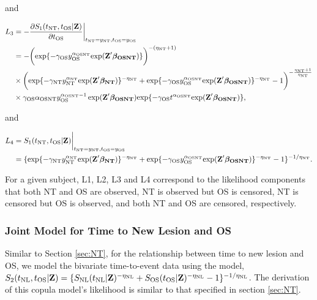 and


\begin{align*}
L_3&=-\frac{\partial S_1(t_{\rm NT}, t_{\rm OS}|\textbf{Z})}{\partial t_{\rm OS}}\bigg|_{t_{\rm NT}=y_{\rm NT},t_{\rm OS}=y_{\rm OS}}\\
&=-\bigg(\mathrm{exp}\{-\gamma_{\rm OS} y_{\rm OS}^{\alpha_{\rm OSNT}}
\mathrm{exp}(\textbf{Z}' \boldsymbol{\beta_{\rm OSNT}} )\}\bigg)^{-(\eta_{\rm NT}+1)}\\
&\times \bigg(\mathrm{exp}\{-\gamma_{\rm NT} y_{\rm NT}^{\alpha_{\rm NT}}
\mathrm{exp}(\textbf{Z}' \boldsymbol{\beta_{\rm NT}} )\}^{-\eta_{\rm NT}}+\mathrm{exp}\{-\gamma_{\rm OS} y_{\rm OS}^{\alpha_{\rm OSNT}}
\mathrm{exp}(\textbf{Z}' \boldsymbol{\beta_{\rm OSNT}} )\}^{-\eta_{\rm NT}}-1\bigg)^{-\frac{\eta_{\rm NT}+1}{\eta_{\rm NT}}}\\
&\times \gamma_{\rm OS} \alpha_{\rm OSNT} y_{\rm OS}^{{\alpha_{\rm OSNT} -1}} \exp(\textbf{Z}' \boldsymbol{\beta_{\rm OSNT}}) \mathrm{exp}\{-\gamma_{\rm OS} t^{\alpha_{\rm OSNT}}
\mathrm{exp}(\textbf{Z}' \boldsymbol{\beta_{\rm OSNT}} )\},
\end{align*}


and

\begin{align*}
L_4&=S_1(t_{\rm NT}, t_{\rm OS}|\textbf{Z})\bigg|_{t_{\rm NT}=y_{\rm NT},t_{\rm OS}=y_{\rm OS}}\\
&=\{\mathrm{exp}\{-\gamma_{\rm NT} y_{\rm NT}^{\alpha_{\rm NT}}
\mathrm{exp}(\textbf{Z}' \boldsymbol{\beta_{\rm NT}} )\}^{-\eta_{\rm NT}}
+\mathrm{exp}\{-\gamma_{\rm OS} y_{\rm OS}^{\alpha_{\rm OSNT}}
\mathrm{exp}(\textbf{Z}' \boldsymbol{\beta_{\rm OSNT}} )\}^{-\eta_{\rm NT}}-1\}^{-1/\eta_{\rm NT}}.
\end{align*}

For a given subject, L1, L2, L3 and L4 correspond to the likelihood components that both NT and OS are observed, NT is observed but OS is censored, NT is censored but OS is observed, and both NT and OS are censored, respectively.



\subsubsection{Joint Model for Time to New Lesion and OS} \label{sec:NL}
Similar to Section \ref{sec:NT}, for the relationship between time to new lesion and OS, we model
the bivariate time-to-event data using the \cite{clayton1978model} model,
$S_2(t_{\rm NL},
t_{\rm OS}|\textbf{Z})=\{S_{\rm NL}(t_{\rm NL}|\textbf{Z})^{-\eta_{\rm NL}}
+S_{\rm OS}(t_{\rm OS}|\textbf{Z})^{-\eta_{\rm NL}}-1\}^{-1/\eta_{\rm NL}}$. The derivation of this copula model's likelihood is similar to that specified in section \ref{sec:NT}.

